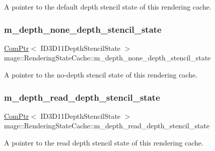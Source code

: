 A pointer to the default depth stencil state of this rendering cache. \hypertarget{structmage_1_1_rendering_state_cache_a2dfd8ceaab6604f77bda85900d0ebd0a}{}\label{structmage_1_1_rendering_state_cache_a2dfd8ceaab6604f77bda85900d0ebd0a} 
\subsubsection{\texorpdfstring{m\+\_\+depth\+\_\+none\+\_\+depth\+\_\+stencil\+\_\+state}{m\_depth\_none\_depth\_stencil\_state}}
{\footnotesize\ttfamily \hyperlink{namespacemage_ae74f374780900893caa5555d1031fd79}{Com\+Ptr}$<$ I\+D3\+D11\+Depth\+Stencil\+State $>$ mage\+::\+Rendering\+State\+Cache\+::m\+\_\+depth\+\_\+none\+\_\+depth\+\_\+stencil\+\_\+state\hspace{0.3cm}{\ttfamily [private]}}

A pointer to the no-\/depth stencil state of this rendering cache. \hypertarget{structmage_1_1_rendering_state_cache_af58f7cc04ca479493902eca2b4f349bc}{}\label{structmage_1_1_rendering_state_cache_af58f7cc04ca479493902eca2b4f349bc} 
\subsubsection{\texorpdfstring{m\+\_\+depth\+\_\+read\+\_\+depth\+\_\+stencil\+\_\+state}{m\_depth\_read\_depth\_stencil\_state}}
{\footnotesize\ttfamily \hyperlink{namespacemage_ae74f374780900893caa5555d1031fd79}{Com\+Ptr}$<$ I\+D3\+D11\+Depth\+Stencil\+State $>$ mage\+::\+Rendering\+State\+Cache\+::m\+\_\+depth\+\_\+read\+\_\+depth\+\_\+stencil\+\_\+state\hspace{0.3cm}{\ttfamily [private]}}

A pointer to the read depth stencil state of this rendering cache. \hypertarget{structmage_1_1_rendering_state_cache_ad1846bcede5c3e6c8ce631b504b45cdf}{}\label{structmage_1_1_rendering_state_cache_ad1846bcede5c3e6c8ce631b504b45cdf} 
